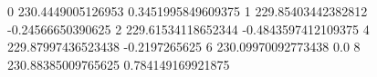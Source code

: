 0 230.4449005126953 0.3451995849609375
1 229.85403442382812 -0.24566650390625
2 229.61534118652344 -0.4843597412109375
4 229.87997436523438 -0.2197265625
6 230.09970092773438 0.0
8 230.88385009765625 0.784149169921875
